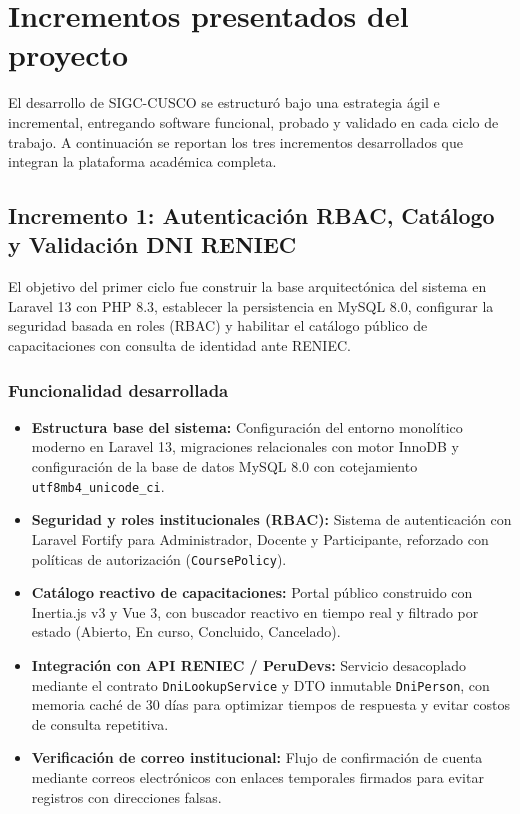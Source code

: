 \section{Incrementos presentados del proyecto}

El desarrollo de SIGC-CUSCO se estructuró bajo una estrategia ágil e incremental, entregando software funcional, probado y validado en cada ciclo de trabajo. A continuación se reportan los tres incrementos desarrollados que integran la plataforma académica completa.

\subsection{Incremento 1: Autenticación RBAC, Catálogo y Validación DNI RENIEC}

El objetivo del primer ciclo fue construir la base arquitectónica del sistema en Laravel 13 con PHP 8.3, establecer la persistencia en MySQL 8.0, configurar la seguridad basada en roles (RBAC) y habilitar el catálogo público de capacitaciones con consulta de identidad ante RENIEC.

\subsubsection{Funcionalidad desarrollada}
\begin{itemize}[nosep]
    \item \textbf{Estructura base del sistema:} Configuración del entorno monolítico moderno en Laravel 13, migraciones relacionales con motor InnoDB y configuración de la base de datos MySQL 8.0 con cotejamiento \texttt{utf8mb4\_unicode\_ci}.
    \item \textbf{Seguridad y roles institucionales (RBAC):} Sistema de autenticación con Laravel Fortify para Administrador, Docente y Participante, reforzado con políticas de autorización (\texttt{CoursePolicy}).
    \item \textbf{Catálogo reactivo de capacitaciones:} Portal público construido con Inertia.js v3 y Vue 3, con buscador reactivo en tiempo real y filtrado por estado (Abierto, En curso, Concluido, Cancelado).
    \item \textbf{Integración con API RENIEC / PeruDevs:} Servicio desacoplado mediante el contrato \texttt{DniLookupService} y DTO inmutable \texttt{DniPerson}, con memoria caché de 30 días para optimizar tiempos de respuesta y evitar costos de consulta repetitiva.
    \item \textbf{Verificación de correo institucional:} Flujo de confirmación de cuenta mediante correos electrónicos con enlaces temporales firmados para evitar registros con direcciones falsas.
\end{itemize}

